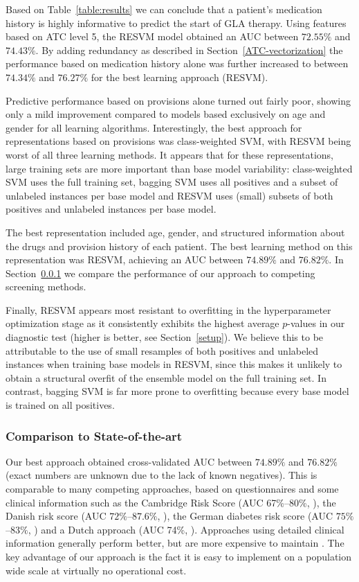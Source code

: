 \documentclass[twoside,11pt]{article}
\begin{document}
Based on Table~\ref{table:results} we can conclude that a patient's medication history is highly informative to predict the start of GLA therapy. Using features based on ATC level 5, the RESVM model obtained an AUC between $72.55\%$ and $74.43\%$. By adding redundancy as described in Section~\ref{ATC-vectorization} the performance based on medication history alone was further increased to between $74.34\%$ and $76.27\%$ for the best learning approach (RESVM).

Predictive performance based on provisions alone turned out fairly poor, showing only a mild improvement compared to models based exclusively on age and gender for all learning algorithms. Interestingly, the best approach for representations based on provisions was class-weighted SVM, with RESVM being worst of all three learning methods. It appears that for these representations, large training sets are more important than base model variability: class-weighted SVM uses the full training set, bagging SVM uses all positives and a subset of unlabeled instances per base model and RESVM uses (small) subsets of both positives and unlabeled instances per base model.

The best representation included age, gender, and structured information about the drugs and provision history of each patient. The best learning method on this representation was RESVM, achieving an AUC between $74.89\%$ and $76.82\%$. In Section~\ref{stateoftheart} we compare the performance of our approach to competing screening methods.

Finally, RESVM appears most resistant to overfitting in the hyperparameter optimization stage as it consistently exhibits the highest average $p$-values in our diagnostic test (higher is better, see Section~\ref{setup}). We believe this to be attributable to the use of small resamples of both positives and unlabeled instances when training base models in RESVM, since this makes it unlikely to obtain a structural overfit of the ensemble model on the full training set. In contrast, bagging SVM is far more prone to overfitting because every base model is trained on all positives.

\subsubsection{Comparison to State-of-the-art} \label{stateoftheart}
Our best approach obtained cross-validated AUC between $74.89\%$ and $76.82\%$ (exact numbers are unknown due to the lack of known negatives). This is comparable to many competing approaches, based on questionnaires and some clinical information such as the Cambridge Risk Score (AUC 67\%--80\%, \citep{spijkerman2004performance, griffin2000diabetes}), the Danish risk score (AUC $72\%$--$87.6\%$, \citep{glumer2004danish}), the German diabetes risk score (AUC $75\%$--$83\%$, \citep{schulze2007accurate}) and a Dutch approach (AUC 74\%, \citep{baan1999performance}). Approaches using detailed clinical information generally perform better, but are more expensive to maintain \citep{stern2002identification, mcneely2003comparison, lindstrom2003diabetes, heikes2008diabetes}. The key advantage of our approach is the fact it is easy to implement on a population wide scale at virtually no operational cost.
\end{document}
